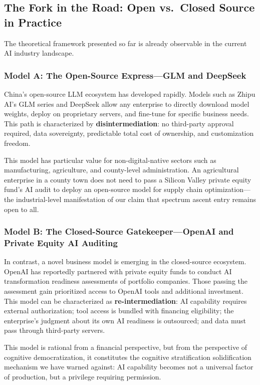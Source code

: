 \subsection{The Fork in the Road: Open vs.\ Closed Source in Practice}

The theoretical framework presented so far is already observable in the current AI industry landscape.

\subsubsection{Model A: The Open-Source Express---GLM and DeepSeek}

China's open-source LLM ecosystem has developed rapidly. Models such as Zhipu AI's GLM series and DeepSeek allow any enterprise to directly download model weights, deploy on proprietary servers, and fine-tune for specific business needs. This path is characterized by \textbf{disintermediation}: no third-party approval required, data sovereignty, predictable total cost of ownership, and customization freedom.

This model has particular value for non-digital-native sectors such as manufacturing, agriculture, and county-level administration. An agricultural enterprise in a county town does not need to pass a Silicon Valley private equity fund's AI audit to deploy an open-source model for supply chain optimization---the industrial-level manifestation of our claim that spectrum ascent entry remains open to all.

\subsubsection{Model B: The Closed-Source Gatekeeper---OpenAI and Private Equity AI Auditing}

In contrast, a novel business model is emerging in the closed-source ecosystem. OpenAI has reportedly partnered with private equity funds to conduct AI transformation readiness assessments of portfolio companies. Those passing the assessment gain prioritized access to OpenAI tools and additional investment. This model can be characterized as \textbf{re-intermediation}: AI capability requires external authorization; tool access is bundled with financing eligibility; the enterprise's judgment about its own AI readiness is outsourced; and data must pass through third-party servers.

This model is rational from a financial perspective, but from the perspective of cognitive democratization, it constitutes the cognitive stratification solidification mechanism we have warned against: AI capability becomes not a universal factor of production, but a privilege requiring permission.

